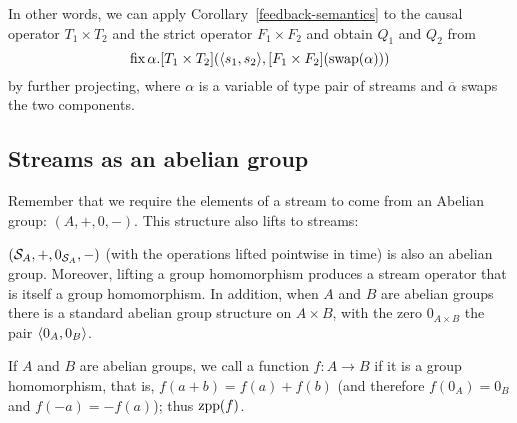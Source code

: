 \begin{center}
\end{center}

In other words,
we can apply Corollary~\ref{feedback-semantics} to the causal operator $T_1\times T_2$
and the strict operator $F_1\times F_2$ and obtain $Q_1$ and $Q_2$ from
$$
\mbox{fix}\,\alpha.[T_1\times T_2](\langle s_1,s_2 \rangle,[F_1\times F_2](\mbox{swap}(\alpha)))
$$
by further projecting, where $\alpha$ is a variable of type pair of streams and $\overline{\alpha}$
swaps the two components.





\subsection{Streams as an abelian group}\label{sec:abelianstreams}

Remember that we require the elements of a stream to come from an Abelian group:
$(A,+,0,-)$.  This structure also lifts to streams:

\begin{proposition}
$(\mathcal{S}_{A},+,0_{\mathcal{S}_{A}},-)$ (with the operations lifted pointwise in time)
is also an abelian group. Moreover, lifting a group homomorphism produces
a stream operator that is itself a group homomorphism.
In addition, when $A$ and $B$ are abelian groups there is a standard abelian group structure
on $A\times B$, with the zero $0_{A \times B}$ the pair $\langle 0_A,0_B \rangle$.
\end{proposition}


\begin{definition}[linear]
If $A$ and $B$ are abelian groups, we call
a function $f: A \rightarrow B$  if it is a group homomorphism, that is,
$f(a+b)=f(a)+f(b)$ (and therefore $f(0_A)=0_B$ and $f(-a)=-f(a)$); thus $\mbox{zpp}(f)$.
\end{definition}

